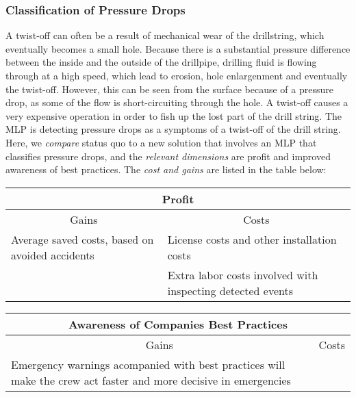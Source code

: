 \documentclass{article}
\begin{document}
\subsubsection{Classification of Pressure Drops}
A twist-off can often be a result of mechanical wear of the drillstring, which eventually becomes a small hole. 
Because there is a substantial pressure difference between the inside and the outside of the drillpipe, drilling fluid is flowing through at a high speed, which lead to erosion, hole enlargenment and eventually the twist-off. 
However, this can be seen from the surface because of a pressure drop, as some of the flow is short-circuiting through the hole. 
A twist-off causes a very expensive operation in order to fish up the lost part of the drill string. 
The MLP is detecting pressure drops as a symptoms of a twist-off of the drill string. 
Here, we \emph{compare} status quo to a new solution that involves an MLP that classifies pressure drops, and the \emph{relevant dimensions} are profit and improved awareness of best practices.
The \emph{cost and gains} are listed in the table below:

\vspace{1ex}
\begin{tabular}{|p{}|p{}|}
\hline
\multicolumn{2}{|c|}{Profit}\\
\hline
\multicolumn{1}{|c|}{Gains} & 
\multicolumn{1}{|c|}{Costs} \\
\hline
Average saved costs, based on avoided accidents &
License costs and other installation costs \\ 
\hline
&
Extra labor costs involved with inspecting detected events \\ 
\hline
\end{tabular}
\vspace{1ex}

\vspace{1ex}
\begin{tabular}{|p{}|p{}|}
\hline
\multicolumn{2}{|c|}{Awareness of Companies Best Practices}\\
\hline
\multicolumn{1}{|c|}{Gains} & 
\multicolumn{1}{|c|}{Costs} \\
\hline
Emergency warnings acompanied with best practices will make the crew act faster and more decisive in emergencies & \\
\hline
\end{tabular}
\vspace{1ex}
\end{document}
